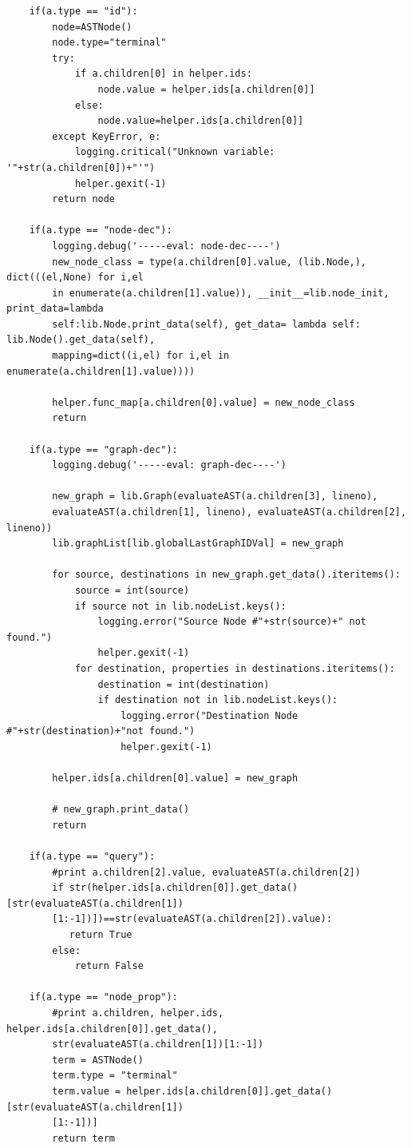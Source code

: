 \documentclass[a4paper]{article}
\begin{document}
\begin{verbatim}
    if(a.type == "id"):
        node=ASTNode()
        node.type="terminal"
        try:
            if a.children[0] in helper.ids:
                node.value = helper.ids[a.children[0]]
            else:
                node.value=helper.ids[a.children[0]]
        except KeyError, e:
            logging.critical("Unknown variable: '"+str(a.children[0])+"'")
            helper.gexit(-1)
        return node

    if(a.type == "node-dec"):
        logging.debug('-----eval: node-dec----')
        new_node_class = type(a.children[0].value, (lib.Node,), dict(((el,None) for i,el 
        in enumerate(a.children[1].value)), __init__=lib.node_init, print_data=lambda 
        self:lib.Node.print_data(self), get_data= lambda self: lib.Node().get_data(self), 
        mapping=dict((i,el) for i,el in enumerate(a.children[1].value))))

        helper.func_map[a.children[0].value] = new_node_class
        return

    if(a.type == "graph-dec"):
        logging.debug('-----eval: graph-dec----')

        new_graph = lib.Graph(evaluateAST(a.children[3], lineno), 
        evaluateAST(a.children[1], lineno), evaluateAST(a.children[2], lineno))
        lib.graphList[lib.globalLastGraphIDVal] = new_graph

        for source, destinations in new_graph.get_data().iteritems():
            source = int(source)
            if source not in lib.nodeList.keys():
                logging.error("Source Node #"+str(source)+" not found.")
                helper.gexit(-1)
            for destination, properties in destinations.iteritems():
                destination = int(destination)
                if destination not in lib.nodeList.keys():
                    logging.error("Destination Node #"+str(destination)+"not found.")
                    helper.gexit(-1)

        helper.ids[a.children[0].value] = new_graph

        # new_graph.print_data()
        return

    if(a.type == "query"):
        #print a.children[2].value, evaluateAST(a.children[2])
        if str(helper.ids[a.children[0]].get_data()[str(evaluateAST(a.children[1])
        [1:-1])])==str(evaluateAST(a.children[2]).value):
           return True
        else:
            return False

    if(a.type == "node_prop"):
        #print a.children, helper.ids, helper.ids[a.children[0]].get_data(), 
        str(evaluateAST(a.children[1])[1:-1])
        term = ASTNode()
        term.type = "terminal"
        term.value = helper.ids[a.children[0]].get_data()[str(evaluateAST(a.children[1])
        [1:-1])]
        return term


\end{verbatim}
\end{document}
